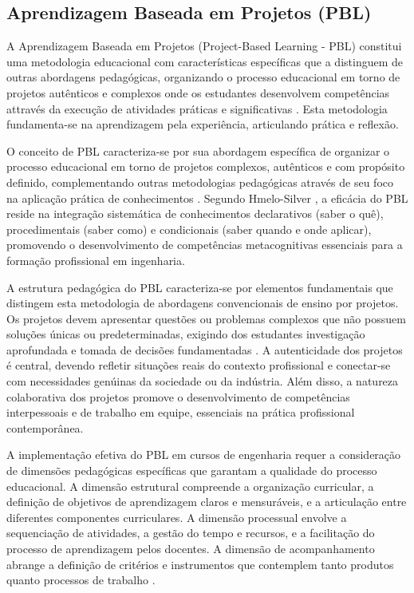 \documentclass[12pt,a4paper]{article}
\begin{document}
\subsection{Aprendizagem Baseada em Projetos (PBL)}

A Aprendizagem Baseada em Projetos (Project-Based Learning - PBL) constitui uma
metodologia educacional com características específicas que a distinguem de
outras abordagens pedagógicas, organizando o processo educacional em torno de
projetos autênticos e complexos onde os estudantes desenvolvem competências
attravés da execução de atividades práticas e significativas \cite{thomas2000,
savery2015}. Esta metodologia fundamenta-se na aprendizagem pela experiência, articulando prática e reflexão.

O conceito de PBL caracteriza-se por sua abordagem específica de organizar o
processo educacional em torno de projetos complexos, autênticos e com propósito
definido, complementando outras metodologias pedagógicas através de seu foco na
aplicação prática de conhecimentos \cite{duch2001}. Segundo Hmelo-Silver
\cite{hmelo2004}, a eficácia do PBL reside na integração sistemática de
conhecimentos declarativos (saber o quê), procedimentais (saber como) e
condicionais (saber quando e onde aplicar), promovendo o desenvolvimento de
competências metacognitivas essenciais para a formação profissional em
ingenharia.

A estrutura pedagógica do PBL caracteriza-se por elementos fundamentais que
distingem esta metodologia de abordagens convencionais de ensino por projetos.
Os projetos devem apresentar questões ou problemas complexos que
não possuem soluções únicas ou predeterminadas, exigindo dos estudantes
investigação aprofundada e tomada de decisões fundamentadas \cite{savery2015}.
A autenticidade dos projetos é central, devendo refletir
situações reais do contexto profissional e conectar-se com necessidades
genúinas da sociedade ou da indústria. Além disso, a natureza colaborativa dos
projetos promove o desenvolvimento de competências interpessoais e de trabalho
em equipe, essenciais na prática profissional contemporânea.

A implementação efetiva do PBL em cursos de engenharia requer a consideração de
dimensões pedagógicas específicas que garantam a qualidade do processo
educacional. A dimensão estrutural compreende a organização curricular, a
definição de objetivos de aprendizagem claros e mensuráveis, e a articulação
entre diferentes componentes curriculares. A dimensão processual envolve a
sequenciação de atividades, a gestão do tempo e recursos, e a facilitação do
processo de aprendizagem pelos docentes. A dimensão de acompanhamento abrange a
definição de critérios e instrumentos que contemplem tanto produtos quanto
processos de trabalho \cite{thomas2000}.
\end{document}
